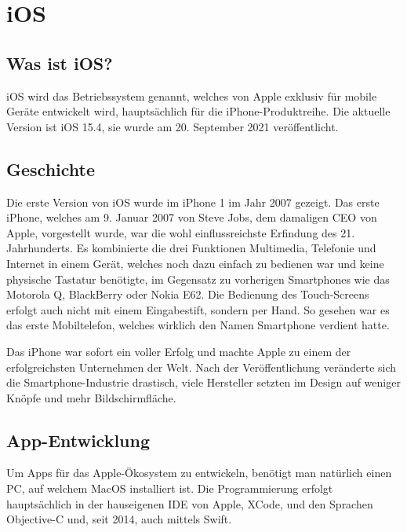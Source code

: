 \section{iOS}
\label{iosdev}

\subsection{Was ist iOS?}
iOS wird das Betriebssystem genannt, welches von Apple exklusiv für mobile Geräte entwickelt wird,
hauptsächlich für die iPhone-Produktreihe. Die aktuelle Version ist iOS 15.4, sie wurde am 20.
September 2021 veröffentlicht.

\subsection{Geschichte}
Die erste Version von iOS wurde im iPhone 1 im Jahr 2007 gezeigt. Das erste iPhone, welches am 9.
Januar 2007 von Steve Jobs, dem damaligen CEO von Apple, vorgestellt wurde, war die wohl
einflussreichste Erfindung des 21. Jahrhunderts. Es kombinierte die drei Funktionen Multimedia,
Telefonie und Internet in einem Gerät, welches noch dazu einfach zu bedienen war und keine physische
Tastatur benötigte, im Gegensatz zu vorherigen Smartphones wie das Motorola Q, BlackBerry oder Nokia
E62. Die Bedienung des Touch-Screens erfolgt auch nicht mit einem Eingabestift, sondern per Hand. So
gesehen war es das erste Mobiltelefon, welches wirklich den Namen Smartphone verdient hatte.

Das iPhone war sofort ein voller Erfolg und machte Apple zu einem der erfolgreichsten Unternehmen
der Welt. Nach der Veröffentlichung veränderte sich die Smartphone-Industrie drastisch, viele
Hersteller setzten im Design auf weniger Knöpfe und mehr Bildschirmfläche.

\subsection{App-Entwicklung}
Um Apps für das Apple-Ökosystem zu entwickeln, benötigt man natürlich einen PC, auf welchem MacOS
installiert ist. Die Programmierung erfolgt hauptsächlich in der hauseigenen IDE von Apple, XCode,
und den Sprachen Objective-C und, seit 2014, auch mittels Swift.
